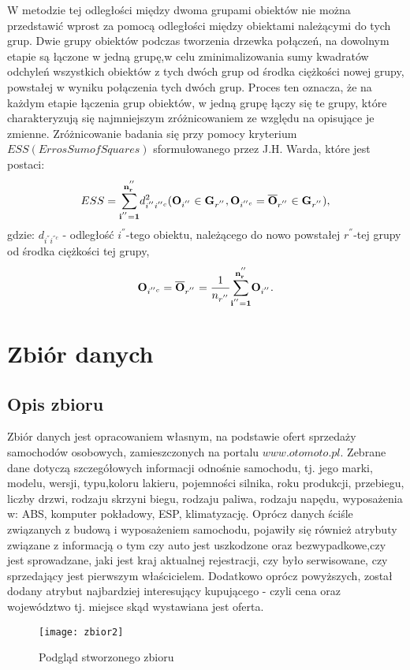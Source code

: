 \documentclass[12pt,a4paper]{report}
\begin{document}
W metodzie tej odległości między dwoma grupami obiektów nie można przedstawić wprost za pomocą odległości między obiektami należącymi do tych grup. Dwie grupy obiektów podczas tworzenia drzewka połączeń, na dowolnym etapie są łączone w jedną grupę,w celu zminimalizowania sumy kwadratów odchyleń wszystkich obiektów z tych dwóch grup od środka ciężkości nowej grupy, powstałej w wyniku połączenia tych dwóch grup. Proces ten oznacza, że na każdym etapie łączenia grup obiektów, w jedną grupę łączy się te grupy, które charakteryzują się najmniejszym zróżnicowaniem ze względu na opisujące je zmienne. Zróżnicowanie badania się przy pomocy kryterium $ESS (Erros Sum of Squares)$ sformułowanego przez J.H. Warda, które jest postaci:
\begin{equation}
ESS= \bold{\sum_{i^{''}=1}^{n_r^{''}}} d_{i^{''}i^{''c}}^2 ( \bold{O}_{i^{''}} \in \bold{G}_{r^{''}}, \bold{O}_{i^{''c}}=\bold{\overline{O}}_{r^{''}} \in \bold{G}_{r^{''}} ),
\end{equation} 
gdzie:
$d_{i^{''}i^{''c}}$ - odległość $i^{''}$-tego obiektu, należącego do nowo powstałej $r^{''}$-tej grupy od środka ciężkości tej grupy,\\
\begin{equation}
\bold{O}_{i^{''c}} = \bold{\overline{O}}_{r^{''}}=\frac{1}{n_{r^{''}}} \bold{\sum_{i^{''}=1}^{n_r^{''}}} \bold{O}_{i^{''}}.
\end{equation}

\newpage
\chapter{Zbiór danych}

\section{Opis zbioru}
\noindent
Zbiór danych jest opracowaniem własnym, na podstawie ofert sprzedaży samochodów osobowych, zamieszczonych na portalu $www.otomoto.pl$. Zebrane dane dotyczą szczegółowych informacji odnośnie samochodu, tj. jego marki, modelu, wersji, typu,koloru lakieru, pojemności silnika, roku produkcji, przebiegu, liczby drzwi, rodzaju skrzyni biegu, rodzaju paliwa, rodzaju napędu, wyposażenia w: ABS, komputer pokładowy, ESP, klimatyzację. Oprócz danych ściśle związanych z budową i wyposażeniem samochodu, pojawiły się również atrybuty związane z informacją o tym czy auto jest uszkodzone oraz bezwypadkowe,czy jest sprowadzane, jaki jest kraj aktualnej rejestracji, czy było serwisowane, czy sprzedający jest pierwszym właścicielem. Dodatkowo oprócz powyższych, został dodany atrybut najbardziej interesujący kupującego - czyli cena oraz województwo tj. miejsce skąd wystawiana jest oferta.
\begin{figure}[h]
\centering
\texttt{[image: zbior2]}
\caption{Podgląd stworzonego zbioru}
\label{fig:obrazek1}
\end{figure}
\end{document}

